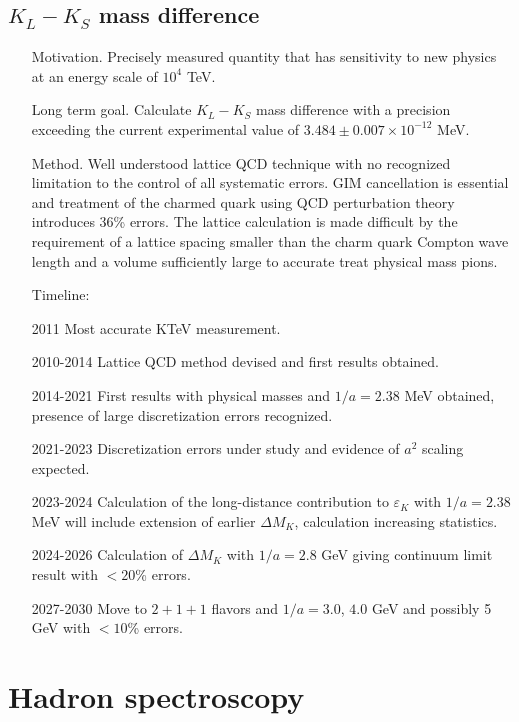 \documentclass{article}
\begin{document}
\subsection{$K_L - K_S$ mass difference}
\begin{itemize}
    \item[Motivation.] Precisely measured quantity that has sensitivity to new physics at an energy scale of $10^4$ TeV.
    \item[Long term goal.] Calculate $K_L - K_S$ mass difference with
      a precision exceeding the current experimental value of $3.484
      \pm 0.007 \times  10^{-12}$ MeV.
    \item[Method.] Well understood lattice QCD technique with no
      recognized limitation to the control of all systematic
      errors. GIM cancellation is essential and treatment of the
      charmed quark using QCD perturbation theory introduces 36\%
      errors. The lattice calculation is made diﬀicult by the
      requirement of a lattice spacing smaller than the charm quark
      Compton wave length and a volume suﬀiciently large to accurate
      treat physical mass pions. 
\item[Timeline:]
    \item[2011] Most accurate KTeV measurement.
    \item[2010-2014] Lattice QCD method devised and first results obtained.
    \item[2014-2021] First results with physical masses and $1/a = 2.38$ MeV obtained, presence of large discretization errors recognized.
    \item[2021-2023] Discretization errors under study and evidence of $a^2$ scaling expected.
    \item[2023-2024] Calculation of the long-distance contribution to
      $\varepsilon_K$ with $1/a = 2.38$ MeV will include extension of
      earlier $\Delta M_K$, calculation increasing statistics.
    \item[2024-2026] Calculation of $\Delta M_K$ with $1/a = 2.8$ GeV
      giving continuum limit result with $< 20$\% errors. 
    \item[2027-2030] Move to $2+1+1$ flavors and $1/a = 3.0$, $4.0$
      GeV and possibly 5 GeV with $<10$\% errors. 
\end{itemize}


\section{Hadron spectroscopy}\label{sec:hadspec}
\end{document}

